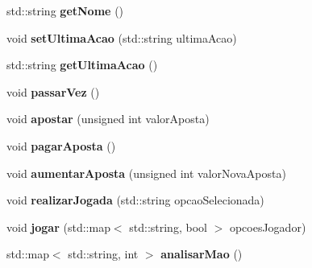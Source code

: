\begin{DoxyCompactItemize}
std\+::string {\bfseries get\+Nome} ()
\item 
\mbox{\label{classpoker_1_1Jogador_a946f9ba0075d58cf2c9cdfafecb844a1}} 
void {\bfseries set\+Ultima\+Acao} (std\+::string ultima\+Acao)
\item 
\mbox{\label{classpoker_1_1Jogador_a1b0b360404e7881568782e9f80275234}} 
std\+::string {\bfseries get\+Ultima\+Acao} ()
\item 
\mbox{\label{classpoker_1_1Jogador_ace116fab08c7e65b5ff3c3f70d09170f}} 
void {\bfseries passar\+Vez} ()
\item 
\mbox{\label{classpoker_1_1Jogador_a03f3f639857b5bdef07a9d1bfd371067}} 
void {\bfseries apostar} (unsigned int valor\+Aposta)
\item 
\mbox{\label{classpoker_1_1Jogador_a5b6e11ee7f841c56816f46b1fff510ad}} 
void {\bfseries pagar\+Aposta} ()
\item 
\mbox{\label{classpoker_1_1Jogador_ade7a67c0d054694a74b3a38aeed7d6ba}} 
void {\bfseries aumentar\+Aposta} (unsigned int valor\+Nova\+Aposta)
\item 
\mbox{\label{classpoker_1_1Jogador_a8ae81ac65fa66ddf3653b058949f925a}} 
void {\bfseries realizar\+Jogada} (std\+::string opcao\+Selecionada)
\item 
\mbox{\label{classpoker_1_1Jogador_a1da564325a856e1a18269098f66758ef}} 
void {\bfseries jogar} (std\+::map$<$ std\+::string, bool $>$ opcoes\+Jogador)
\item 
\mbox{\label{classpoker_1_1Jogador_ac9fde1f1e4bfc08753fc8e955d764d95}} 
std\+::map$<$ std\+::string, int $>$ {\bfseries analisar\+Mao} ()
\end{DoxyCompactItemize}
